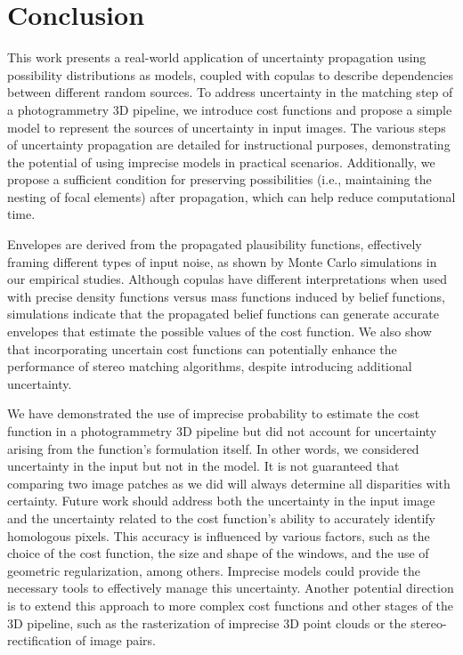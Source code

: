 \documentclass{article}
\begin{document}
\section{Conclusion}
This work presents a real-world application of uncertainty propagation using possibility distributions as models, coupled with copulas to describe dependencies between different random sources. To address uncertainty in the matching step of a photogrammetry 3D pipeline, we introduce cost functions and propose a simple model to represent the sources of uncertainty in input images. The various steps of uncertainty propagation are detailed for instructional purposes, demonstrating the potential of using imprecise models in practical scenarios. Additionally, we propose a sufficient condition for preserving possibilities (i.e., maintaining the nesting of focal elements) after propagation, which can help reduce computational time.

Envelopes are derived from the propagated plausibility functions, effectively framing different types of input noise, as shown by Monte Carlo simulations in our empirical studies. Although copulas have different interpretations when used with precise density functions versus mass functions induced by belief functions, simulations indicate that the propagated belief functions can generate accurate envelopes that estimate the possible values of the cost function. We also show that incorporating uncertain cost functions can potentially enhance the performance of stereo matching algorithms, despite introducing additional uncertainty.

We have demonstrated the use of imprecise probability to estimate the cost function in a photogrammetry 3D pipeline but did not account for uncertainty arising from the function's formulation itself. In other words, we considered uncertainty in the input but not in the model. It is not guaranteed that comparing two image patches as we did will always determine all disparities with certainty. Future work should address both the uncertainty in the input image and the uncertainty related to the cost function's ability to accurately identify homologous pixels. This accuracy is influenced by various factors, such as the choice of the cost function, the size and shape of the windows, and the use of geometric regularization, among others. Imprecise models could provide the necessary tools to effectively manage this uncertainty. Another potential direction is to extend this approach to more complex cost functions and other stages of the 3D pipeline, such as the rasterization of imprecise 3D point clouds or the stereo-rectification of image pairs.
\end{document}
